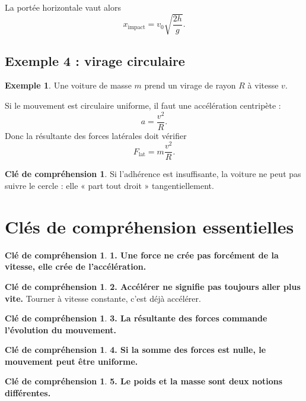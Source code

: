 \documentclass[11pt,a4paper]{article}
\theoremstyle{definition}
\newtheorem{exemple}[definition]{Exemple}
\newtheorem{interpretation}[definition]{Clé de compréhension}
\theoremstyle{plain}
\theoremstyle{remark}
\begin{document}
La portée horizontale vaut alors
\[
x_{\text{impact}}=v_0\sqrt{\frac{2h}{g}}.
\]

\subsection{Exemple 4 : virage circulaire}

\begin{exemple}
Une voiture de masse $m$ prend un virage de rayon $R$ à vitesse $v$.
\end{exemple}

Si le mouvement est circulaire uniforme, il faut une accélération centripète :
\[
a=\frac{v^2}{R}.
\]
Donc la résultante des forces latérales doit vérifier
\[
F_{\text{lat}}=m\frac{v^2}{R}.
\]

\begin{interpretation}
Si l'adhérence est insuffisante, la voiture ne peut pas suivre le cercle : elle « part tout droit » tangentiellement.
\end{interpretation}

\section{Clés de compréhension essentielles}

\begin{interpretation}
\textbf{1. Une force ne crée pas forcément de la vitesse, elle crée de l'accélération.}
\end{interpretation}

\begin{interpretation}
\textbf{2. Accélérer ne signifie pas toujours aller plus vite.}  
Tourner à vitesse constante, c'est déjà accélérer.
\end{interpretation}

\begin{interpretation}
\textbf{3. La résultante des forces commande l'évolution du mouvement.}
\end{interpretation}

\begin{interpretation}
\textbf{4. Si la somme des forces est nulle, le mouvement peut être uniforme.}
\end{interpretation}

\begin{interpretation}
\textbf{5. Le poids et la masse sont deux notions différentes.}
\end{interpretation}
\end{document}
